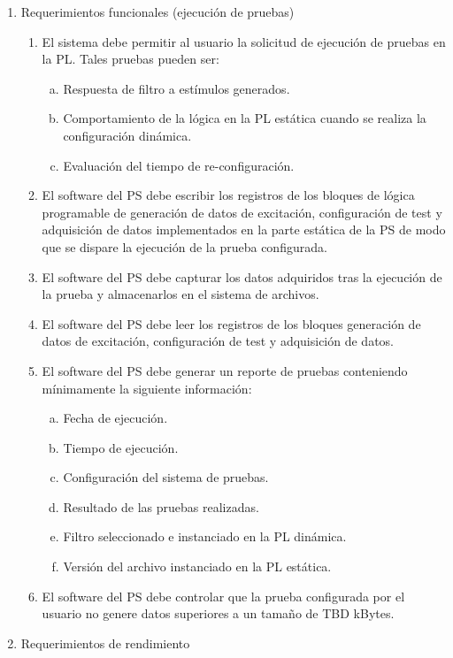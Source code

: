 \documentclass[
11pt, %
]{charter}
\begin{document}
\begin{enumerate}
	
	\item Requerimientos funcionales (ejecución de pruebas)
	\begin{enumerate}
		\item El sistema debe permitir al usuario la solicitud de ejecución de pruebas en la PL. Tales pruebas pueden ser:
		\begin{enumerate}[a.]
			\item Respuesta de filtro a estímulos generados.
			\item Comportamiento de la lógica en la PL estática cuando se realiza la configuración dinámica.
			\item Evaluación del tiempo de re-configuración.
		\end{enumerate}
		\item El software del PS debe escribir los registros de los bloques de lógica programable de generación de datos de excitación, configuración de test y adquisición de datos implementados en la parte estática de la PS de modo que se dispare la ejecución de la prueba configurada.
		\item El software del PS debe capturar los datos adquiridos tras la ejecución de la prueba y almacenarlos en el sistema de archivos.
		\item El software del PS debe leer los registros de los bloques generación de datos de excitación, configuración de test y adquisición de datos.
		\item El software del PS debe generar un reporte de pruebas conteniendo mínimamente la siguiente información:
		\begin{enumerate}[a.]
			\item Fecha de ejecución.
			\item Tiempo de ejecución.
			\item Configuración del sistema de pruebas.
			\item Resultado de las pruebas realizadas.
			\item Filtro seleccionado e instanciado en la PL dinámica.
			\item Versión del archivo instanciado en la PL estática.	
		\end{enumerate}
		\item El software del PS debe controlar que la prueba configurada por el usuario no genere datos superiores a un tamaño de TBD kBytes.
	\end{enumerate}
	\item Requerimientos de rendimiento
	\begin{enumerate}

\end{enumerate}
\end{enumerate}
\end{document}
